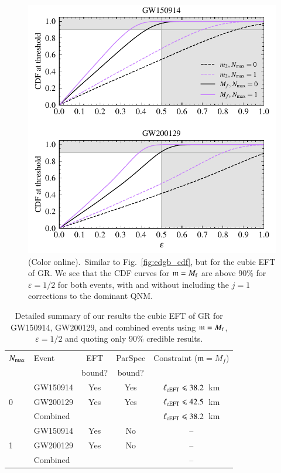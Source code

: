 \documentclass[twocolumn,
               prd,
               aps,
               superscriptaddress,
               tightenlines,
               nofootinbib,
               eqsecnum,
               amsfonts,
               amsmath,
               longbibliography]{revtex4-1}
\newcommand{\gm}{\mathfrak{m}}
\begin{document}
\begin{figure}[t]
\includegraphics[width=\columnwidth]{figs/ceft_cdf_varying_threshold.pdf}
\caption{(Color online).~Similar to Fig.~\ref{fig:edgb_cdf}, but for the cubic EFT of GR.
We see that the CDF curves for $\gm = M_{\rm f}$ are above 90\% for $\varepsilon =
1/2$ for both events, with and without including the $j = 1$ corrections to
the dominant QNM.
}
\label{fig:cEFT_cdf}
\end{figure}

\begin{table}[h]
\begin{tabular}{l l c c c}
\hline
\hline
$N_{\rm max}$ & Event & EFT    & ParSpec & Constraint ($\gm = M_{f}$) \\
              &       & bound? & bound?  &                            \\
\hline
  & GW150914  & Yes & Yes &  $\ell_{\rm cEFT} \leqslant 38.2$~km \\
0 & GW200129  & Yes & Yes &  $\ell_{\rm cEFT} \leqslant 42.5$~km \\
  & Combined  &     &     &  \cellcolor{black!10}$\ell_{\rm cEFT} \leqslant 38.2$~km \\
\hline
  & GW150914  & Yes  & No  &  -- \\
1 & GW200129  & Yes  & No  &  -- \\
  & Combined  &      &     &  -- \\
\hline
\hline
\end{tabular}
\caption{Detailed summary of our results the cubic EFT of GR for GW150914, GW200129, and
combined events using $\gm = M_{\rm f}$, $\varepsilon = 1/2$ and quoting only 90\% credible results.
}
\label{tab:summary_ceft}
\end{table}
\end{document}

